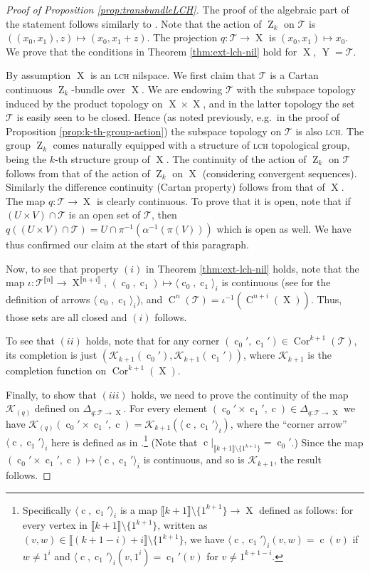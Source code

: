 \documentclass[a4paper,12pt,reqno]{amsart}
\theoremstyle{definition}
\def\to{\rightarrow}
\newcommand*{\db}[1]{\llbracket #1\rrbracket}
\newcommand{\mc}{\mathcal}
\DeclareMathOperator{\ab}{Z}
\DeclareMathOperator{\q}{c}
\DeclareMathOperator{\ns}{X}
\DeclareMathOperator{\nss}{Y}
\DeclareMathOperator{\cu}{C}
\DeclareMathOperator{\cor}{Cor}
\begin{document}
\begin{proof}[Proof of Proposition \ref{prop:transbundleLCH}]
The proof of the algebraic part of the statement follows similarly to \cite[\S 3.3.4]{Cand:Notes1}. Note that the action of $\ab_k$ on $\mc{T}$ is $((x_0,x_1),z)\mapsto (x_0,x_1+z)$. The projection $q:\mc{T}\to \ns$ is $(x_0,x_1)\mapsto x_0$. We  prove that the conditions in Theorem \ref{thm:ext-lch-nil} hold for $\ns$, $\nss=\mc{T}$.

By assumption $\ns$ is an \textsc{lch} nilspace. We first claim that $\mc{T}$ is a Cartan continuous $\ab_k$-bundle over $\ns$. We are endowing $\mc{T}$ with the subspace topology induced by the product topology on $\ns\times \ns$, and in the latter topology the set $\mc{T}$ is easily seen to be closed. Hence (as noted previously, e.g.\ in the proof of Proposition \ref{prop:k-th-group-action}) the subspace topology on $\mc{T}$ is also \textsc{lch}. The group $\ab_k$ comes naturally equipped with a structure of \textsc{lch} topological group, being the $k$-th structure group of $\ns$. The continuity of the action of $\ab_k$ on $\mc{T}$ follows from that of the action of $\ab_k$ on $\ns$ (considering convergent sequences). Similarly the difference continuity (Cartan property) follows from that of $\ns$. The map $q:\mc{T}\to \ns$ is clearly continuous. To prove that it is open, note that if $(U\times V)\cap \mc{T}$ is an open set of $\mc{T}$, then $q((U\times V)\cap \mc{T})=U\cap \pi^{-1}(\alpha^{-1}(\pi(V)))$ which is open as well. We have thus confirmed our claim at the start of this paragraph.

Now, to see that property $(i)$ in Theorem \ref{thm:ext-lch-nil} holds, note that the map $\iota:\mc{T}^{\db{n}}\to \ns^{\db{n+i}}$, $(\q_0,\q_1)\mapsto \langle \q_0,\q_1\rangle_i$ is continuous (see \cite[\S 3.1.4]{Cand:Notes1} for the definition of arrows $\langle \q_0,\q_1\rangle_i$), and $\cu^n(\mc{T})=\iota^{-1}(\cu^{n+i}(\ns))$. Thus, those sets are all closed and $(i)$ follows.

To see that $(ii)$ holds, note that for any corner $(\q_0',\q_1')\in \cor^{k+1}(\mc{T})$, its completion is just $(\mc{K}_{k+1}(\q_0'),\mc{K}_{k+1}(\q_1'))$, where $\mc{K}_{k+1}$ is the completion function on $\cor^{k+1}(\ns)$.

Finally, to show that $(iii)$ holds, we need to prove the continuity of the map $\mc{K}_{(q)}$ defined on $\Delta_{q:\mc{T}\to \ns}$. For every element $(\q_0'\times \q_1',\q)\in \Delta_{q:\mc{T}\to \ns}$ we have $\mc{K}_{(q)}(\q_0'\times \q_1',\q) = \mc{K}_{k+1}(\langle \q,\q_1'\rangle_i)$, where the ``corner arrow'' $\langle \q,\q_1'\rangle_i$ here is defined as in \cite[\S 3.1.4]{Cand:Notes1}.\footnote{Specifically $\langle \q,\q_1'\rangle_i$ is a map $\db{k+1}\setminus\{1^{k+1}\}\to \ns$ defined as follows: for every vertex in $\db{k+1}\setminus\{1^{k+1}\}$, written as $(v,w)\in \db{(k+1-i)+i}\setminus\{1^{k+1}\}$, we have $\langle \q,\q_1'\rangle_i(v,w)=\q(v)$ if $w\not=1^i$ and $\langle \q,\q_1'\rangle_i(v,1^i)=\q_1'(v)$ for $v\not=1^{k+1-i}$.} (Note that $\q|_{\db{k+1}\setminus\{1^{k+1}\}} = \q_0'$.) Since the map $(\q_0'\times \q_1',\q)\mapsto \langle \q,\q_1'\rangle_i$ is continuous, and so is $\mc{K}_{k+1}$, the result follows.
\end{proof}
\end{document}
